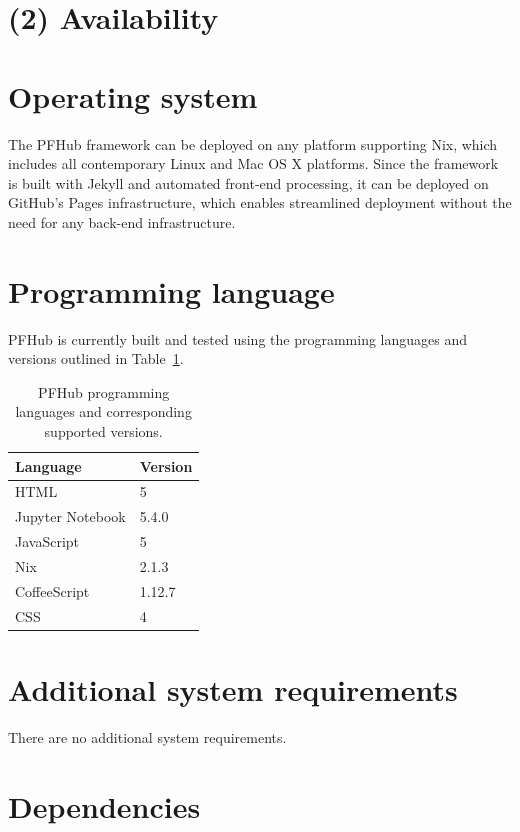 \documentclass{jors}
\begin{document}
\section*{(2) Availability}
\vspace{0.5cm}
\section*{Operating system}

The PFHub framework can be deployed on any platform supporting Nix,
which includes all contemporary Linux and Mac OS X platforms. Since
the framework is built with Jekyll and automated front-end processing,
it can be deployed on GitHub's Pages infrastructure, which enables
streamlined deployment without the need for any back-end
infrastructure.

\section*{Programming language}

PFHub is currently built and tested using the programming languages
and versions outlined in Table~\ref{tab:versions}.

\begin{table}[h!]
  \centering
  \caption{PFHub programming languages and corresponding supported
    versions.}
  \begin{tabular}{|l|l|}
    \hline
    Language         & Version \\
    \hline
    HTML             & 5       \\
    Jupyter Notebook & 5.4.0   \\
    JavaScript       & 5       \\
    Nix              & 2.1.3   \\
    CoffeeScript     & 1.12.7  \\
    CSS              & 4       \\
    \hline
  \end{tabular}
  \label{tab:versions}
\end{table}


\section*{Additional system requirements}

There are no additional system requirements.

\section*{Dependencies}
\end{document}
